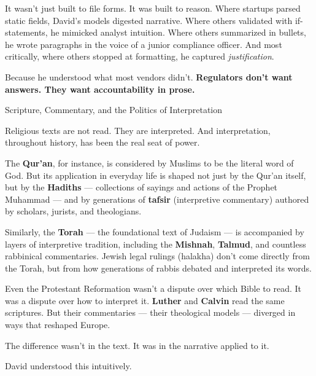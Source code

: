 It wasn’t just built to file forms. It was built to reason.
Where startups parsed static fields, David’s models digested narrative.
Where others validated with if-statements, he mimicked analyst intuition.
Where others summarized in bullets, he wrote paragraphs in the voice of a junior compliance officer.
And most critically, where others stopped at formatting, he captured \textit{justification}.

Because he understood what most vendors didn’t.
\textbf{Regulators don’t want answers. They want accountability in prose.}

\medskip

\begin{HistoricalSidebar}{Scripture, Commentary, and the Politics of Interpretation}

    Religious texts are not read. They are interpreted.
    And interpretation, throughout history, has been the real seat of power.
    
    \medskip
    
    The \textbf{Qur’an}, for instance, is considered by Muslims to be the literal word of God. But its 
    application in everyday life is shaped not just by the Qur’an itself, but by the \textbf{Hadiths} --- 
    collections of sayings and actions of the Prophet Muhammad --- and by generations of \textbf{tafsir} 
    (interpretive commentary) authored by scholars, jurists, and theologians.
    
    \medskip
    
    Similarly, the \textbf{Torah} — the foundational text of Judaism — is accompanied by layers of 
    interpretive tradition, including the \textbf{Mishnah}, \textbf{Talmud}, and countless rabbinical commentaries. 
    Jewish legal rulings (halakha) don’t come directly from the Torah, but from how generations of rabbis 
    debated and interpreted its words.
    
    \medskip
    
    Even the Protestant Reformation wasn’t a dispute over which Bible to read. It was a dispute over how to 
    interpret it. \textbf{Luther} and \textbf{Calvin} read the same scriptures. But their commentaries ---
    their theological models --- diverged in ways that reshaped Europe.  

    \medskip
    
    The difference wasn’t in the text. It was in the narrative applied to it.
    
    \medskip
    
    David understood this intuitively.


\end{HistoricalSidebar}
